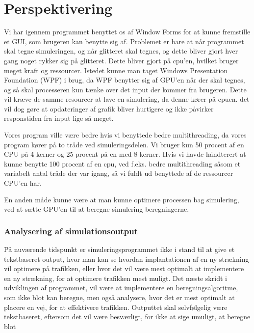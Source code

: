 \chapter{Perspektivering}\label{Perspektivering}
Vi har igennem programmet benyttet os af Window Forms for at kunne fremstille et GUI, som brugeren kan benytte sig af. Problemet er bare at når programmet skal tegne simuleringen, og når glitteret skal tegnes, og dette bliver gjort hver gang noget rykker sig på glitteret. Dette bliver gjort på cpu'en, hvilket bruger meget kraft og ressourcer. Istedet kunne man taget Windows Presentation Foundation (WPF) i brug, da WPF benytter sig af GPU'en når der skal tegnes, og så skal processeren kun tænke over det input der kommer fra brugeren. Dette vil kræve de samme resourcer at lave en simulering, da denne kører på cpuen. det vil dog gøre at opdateringer af grafik bliver hurtigere og ikke påvirker responstiden fra input lige så meget.


\vspace{5mm}

Vores program ville være bedre hvis vi benyttede bedre multithreading, da vores program kører på to tråde ved simuleringsdelen. Vi bruger kun 50 procent af en CPU på 4 kerner og 25 procent på en med 8 kerner. Hvis vi havde håndterert at kunne benytte 100 procent af en cpu, ved f.eks. bedre multithreading såsom et variabelt antal tråde der var igang, så vi fuldt ud benyttede af de ressourcer CPU'en har.

\vspace{5mm}

En anden måde kunne være at man kunne optimere processen bag simulering, ved at sætte GPU'en til at beregne simulering beregningerne.

\subsection*{Analysering af simulationsoutput}
På nuværende tidspunkt er simuleringsprogrammet ikke i stand til at give et tekstbaseret output, hvor man kan se hvordan implantationen af en ny strækning vil optimere på trafikken, eller hvor det vil være mest optimalt at implementere en ny strækning, for at optimere trafikken mest muligt. Det næste skridt i udviklingen af programmet, vil være at implementere en beregningsalgoritme, som ikke blot kan beregne, men også analysere, hvor det er mest optimalt at placere en vej, for at effektivere trafikken. Outputtet skal selvfølgelig være tekstbaseret, eftersom det vil være besværligt, for ikke at sige umuligt, at beregne blot 